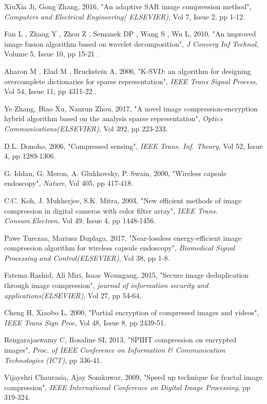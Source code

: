 \documentclass[10pt,a4paper,journal]{IEEEtran}
\begin{document}
\begin{thebibliography}{8}
	
    XiuXia Ji, Gong Zhang, 2016, "An adaptive SAR image compression method", \textit{Computers and Electrical Engineering(
ELSEVIER)}, Vol 7, Issue 2, pp 1-12.

 Fan L , Zhang Y , Zhou Z , Semanek DP , Wang S , Wu L, 2010, "An improved image fusion algorithm based on wavelet decomposition",\textit{ J Converg Inf Technol}, Volume 5, Issue 10, pp 15-21 .

 Aharon M , Elad M , Bruckstein A, 2006, "K-SVD: an algorithm for designing overcomplete dictionaries for sparse representation", \textit{IEEE Trans Signal Process}, Vol 54, Issue 11, pp 4311-22 .


  Ye Zhang, Biao Xu, Nanrun Zhou, 2017, "A novel image compression-encryption hybrid algorithm based on the analysis sparse representation", \textit{Optics Communications(ELSEVIER)}, Vol 392, pp 223-233.

D.L. Donoho, 2006, "Compressed sensing",\textit{ IEEE Trans. Inf. Theory}, Vol 52, Issue 4, pp 1289-1306. 

G. Iddan, G. Meron, A. Glukhovsky, P. Swain, 2000, "Wireless capsule endoscopy", \textit{Nature}, Vol 405, pp 417-418.

 C.C. Koh, J. Mukherjee, S.K. Mitra,  2003, "New efficient methods of image compression in digital cameras with color filter array", \textit{IEEE Trans. Consum.Electron}, Vol 49, Issue 4, pp 1448-1456.

 Pawe Turczaa, Mariusz Duplaga, 2017, "Near-lossless energy-efficient image compression algorithm for wireless capsule endoscopy",\textit{ Biomedical Signal Processing and Control(ELSEVIER)}, Vol 38, pp 1-8.

 Fatema Rashid, Ali Miri, Isaac Woungang, 2015, "Secure image deduplication through image compression", \textit{journal of information security and applications(ELSEVIER)}, Vol 27, pp 54-64.

 Cheng H, Xiaobo L, 2000, "Partial encryption of compressed images and
videos", \textit{IEEE Trans Sign Proc}, Vol 48, Issue 8, pp 2439-51.

 Rengarajaswamy C, Rosaline SI, 2013, "SPIHT compression on encrypted
images", \textit{Proc. of IEEE Conference on Information \& Communication Technologies (ICT)}, pp 336-41.

 Vijayshri Chaurasia, Ajay Somkuwar,  2009, "Speed up technique for fractal image compression",\textit{ IEEE International Conference on Digital Image Processing}, pp 319-324.


\end{thebibliography}
\end{document}
